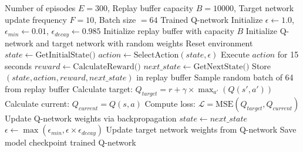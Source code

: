 \begin{algorithm}
\caption{DQN Training Process}
\begin{algorithmic}[1]
\Require Number of episodes $E = 300$, Replay buffer capacity $B = 10000$, 
         Target network update frequency $F = 10$, Batch size $= 64$
\Ensure Trained Q-network
    \State Initialize $\epsilon \leftarrow 1.0$, $\epsilon_{min} \leftarrow 0.01$, $\epsilon_{decay} \leftarrow 0.985$
    \State Initialize replay buffer with capacity $B$
    \State Initialize Q-network and target network with random weights
        \State Reset environment
        \State $state \leftarrow \text{GetInitialState()}$
            \State $action \leftarrow \text{SelectAction}(state, \epsilon)$ 
            \State Execute $action$ for 15 seconds
            \State $reward \leftarrow \text{CalculateReward()}$
            \State $next\_state \leftarrow \text{GetNextState()}$
            \State Store $(state, action, reward, next\_state)$ in replay buffer
                \State Sample random batch of 64 from replay buffer
                \State Calculate target: $Q_{target} = r + \gamma \times \max_{a'}(Q(s', a'))$
                \State Calculate current: $Q_{current} = Q(s, a)$
                \State Compute loss: $\mathcal{L} = \text{MSE}(Q_{target}, Q_{current})$
                \State Update Q-network weights via backpropagation
            \EndIf
            \State $state \leftarrow next\_state$
        \EndWhile
        \State $\epsilon \leftarrow \max(\epsilon_{min}, \epsilon \times \epsilon_{decay})$ 
            \State Update target network weights from Q-network
        \EndIf
            \State Save model checkpoint
        \EndIf
    \EndFor
    \State \Return trained Q-network
\EndProcedure
\end{algorithmic}
\end{algorithm}
